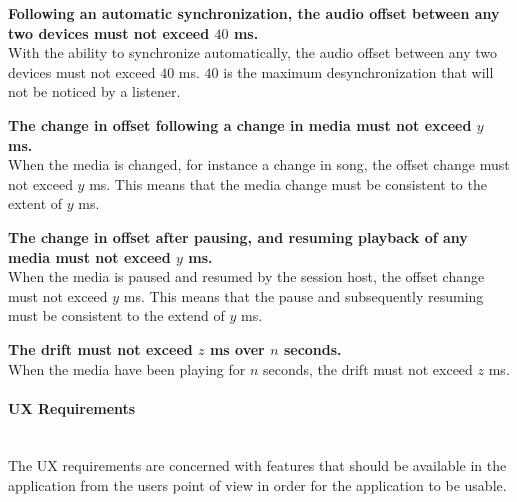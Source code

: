 \begin{eletterate}
    \begin{eletterate}
        \item \textbf{Following an automatic synchronization, the audio offset between any two devices must not exceed $40$ ms.} \hfill\\
            With the ability to synchronize automatically, the audio offset between any two devices must not exceed $40$ ms.
            $40$ is the maximum desynchronization that will not be noticed by a listener.

        \item \textbf{The change in offset following a change in media must not exceed $y$ ms.} \hfill\\
            When the media is changed, for instance a change in song, the offset change must not exceed $y$ ms.
            This means that the media change must be consistent to the extent of $y$ ms.

        \item \textbf{The change in offset after pausing, and resuming playback of any media must not exceed $y$ ms.} \hfill\\
            When the media is paused and resumed by the session host, the offset change must not exceed $y$ ms.
            This means that the pause and subsequently resuming must be consistent to the extend of $y$ ms.

        \item \textbf{The drift must not exceed $z$ ms over $n$ seconds.} \hfill\\
            When the media have been playing for $n$ seconds, the drift must not exceed $z$ ms.
    \end{eletterate}
\end{eletterate}

\paragraph{\ac{UX} Requirements} \hfill\\
The \ac{UX} requirements are concerned with features that should be available in the application from the users point of view in order for the application to be usable.

